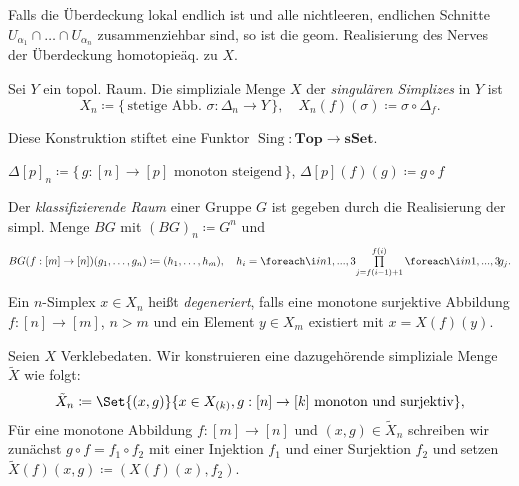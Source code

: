\documentclass{cheat-sheet}
\newcommand{\nspace}[1]{\foreach \i in {1,...,#1}{ \! }} %
\newcommand{\sSet}{\mathbf{sSet}} %
\newcommand{\Top}{\mathbf{Top}} %
\DeclareMathOperator{\Sing}{Sing} %
\begin{document}
\begin{bem}
  Falls die Überdeckung lokal endlich ist und alle nichtleeren, endlichen Schnitte $U_{\alpha_1} \cap \ldots \cap U_{\alpha_n}$ zusammenziehbar sind, so ist die geom. Realisierung des Nerves der Überdeckung homotopieäq. zu $X$.
\end{bem}

\begin{defn}
  Sei $Y$ ein topol. Raum. Die simpliziale Menge $X$ der \emph{singulären Simplizes} in $Y$ ist
  \[
    X_n \coloneqq \{ \, \text{stetige Abb. } \sigma : \Delta_n \to Y \, \}, \quad
    X_n(f)(\sigma) \coloneqq \sigma \circ \Delta_f.
  \]
\end{defn}

\begin{bem}
  Diese Konstruktion stiftet eine Funktor $\Sing : \Top \to \sSet$.
\end{bem}

\begin{defn}
  $\Delta[p]_n \coloneqq \{ \, g : [n] \to [p] \text{ monoton steigend} \, \}$, $\Delta[p](f)(g) \coloneqq g \circ f$
\end{defn}

\begin{defn}
  Der \emph{klassifizierende Raum} einer Gruppe $G$ ist gegeben durch die Realisierung der simpl. Menge $BG$ mit $(BG)_n \coloneqq G^n$ und
  \begin{align*}
    BG(f : [m] \to [n])(g_1, \ldots, g_n) \coloneqq
    (h_1, \ldots, h_m), \quad h_i = \nspace{3} \prod_{j=f(i-1)+1}^{f(i)} \nspace{3} g_j.
  \end{align*}
\end{defn}

\begin{defn}
  Ein $n$-Simplex $x \in X_n$ heißt \emph{degeneriert}, falls eine monotone surjektive Abbildung $f : [n] \to [m]$, $n > m$ und ein Element $y \in X_m$ existiert mit $x = X(f)(y)$.
\end{defn}

\begin{defn}
  Seien $X$ Verklebedaten. Wir konstruieren eine dazugehörende simpliziale Menge $\tilde{X}$ wie folgt:
  \[ \tilde{X}_n \coloneqq \Set{ (x, g) }{ x \in X_{(k)}, g : [n] \to [k] \text{ monoton und surjektiv} }, \]
  Für eine monotone Abbildung $f : [m] \to [n]$ und $(x, g) \in \tilde{X}_n$ schreiben wir zunächst $g \circ f = f_1 \circ f_2$ mit einer Injektion $f_1$ und einer Surjektion $f_2$ und setzen
  $\tilde{X}(f)(x, g) \coloneqq (X(f)(x), f_2)$.
\end{defn}
\end{document}
